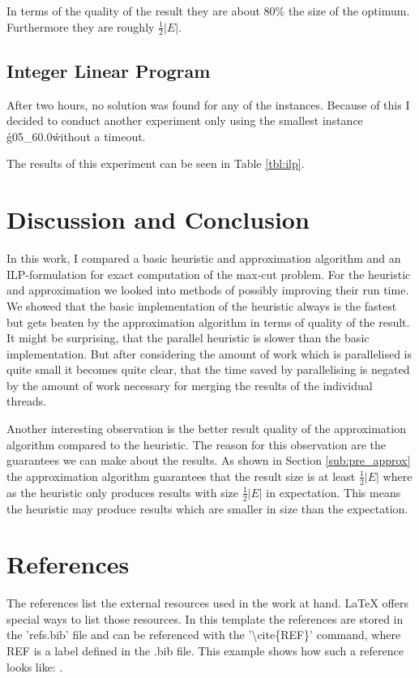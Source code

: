 \documentclass[twocolumn]{article}
\begin{document}
In terms of the quality of the result they are about 80\% the size of the optimum.
Furthermore they are roughly $\frac{1}{2}|E|$. 

\subsection{Integer Linear Program}
After two hours, no solution was found for any of the instances.
Because of this I decided to conduct another experiment only using the smallest instance \'g05\_60.0\'
without a timeout.

The results of this experiment can be seen in Table \ref{tbl:ilp}.

\section{Discussion and Conclusion}

In this work, I compared a basic heuristic and approximation algorithm and an ILP-formulation 
for exact computation of the max-cut problem.
For the heuristic and approximation we looked into methods of possibly improving their run time.
We showed that the basic implementation of the heuristic always is the fastest but gets beaten
by the approximation algorithm in terms of quality of the result. It might be surprising, that
the parallel heuristic is slower than the basic implementation.
But after considering the amount of work which is parallelised is quite small it becomes quite
clear, that the time saved by parallelising is negated by the amount of work necessary for
merging the results of the individual threads.

Another interesting observation is the better result quality of the approximation algorithm
compared to the heuristic.
The reason for this observation are the guarantees we can make about the results.
As shown in Section \ref{sub:pre_approx} the approximation algorithm guarantees that the
result size is at least $\frac{1}{2}|E|$ where as the heuristic only produces results
with size $\frac{1}{2}|E|$ in expectation. This means the heuristic may produce results
which are smaller in size than the expectation.

\section{References}
The references list the external resources used in the work at hand. \LaTeX$ $  offers special ways to list those resources. In this template the references are stored in the 'refs.bib' file and can be referenced with the '\textbackslash$ $cite\{REF\}' command, where REF is a label defined in the .bib file. This example shows how such a reference looks like: \cite{exa}.



\end{document}
